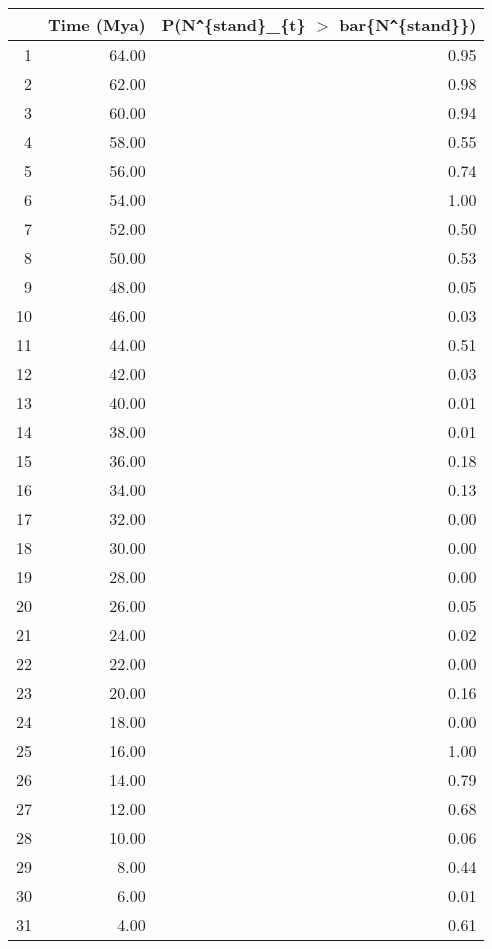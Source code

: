 \begin{table}[ht]
\centering
\begin{tabular}{rrr}
  \hline
 & Time (Mya) & P(N\verb|^|\{stand\}\_\{t\} $>$ bar\{N\verb|^|\{stand\}\}) \\ 
  \hline
1 & 64.00 & 0.95 \\ 
  2 & 62.00 & 0.98 \\ 
  3 & 60.00 & 0.94 \\ 
  4 & 58.00 & 0.55 \\ 
  5 & 56.00 & 0.74 \\ 
  6 & 54.00 & 1.00 \\ 
  7 & 52.00 & 0.50 \\ 
  8 & 50.00 & 0.53 \\ 
  9 & 48.00 & 0.05 \\ 
  10 & 46.00 & 0.03 \\ 
  11 & 44.00 & 0.51 \\ 
  12 & 42.00 & 0.03 \\ 
  13 & 40.00 & 0.01 \\ 
  14 & 38.00 & 0.01 \\ 
  15 & 36.00 & 0.18 \\ 
  16 & 34.00 & 0.13 \\ 
  17 & 32.00 & 0.00 \\ 
  18 & 30.00 & 0.00 \\ 
  19 & 28.00 & 0.00 \\ 
  20 & 26.00 & 0.05 \\ 
  21 & 24.00 & 0.02 \\ 
  22 & 22.00 & 0.00 \\ 
  23 & 20.00 & 0.16 \\ 
  24 & 18.00 & 0.00 \\ 
  25 & 16.00 & 1.00 \\ 
  26 & 14.00 & 0.79 \\ 
  27 & 12.00 & 0.68 \\ 
  28 & 10.00 & 0.06 \\ 
  29 & 8.00 & 0.44 \\ 
  30 & 6.00 & 0.01 \\ 
  31 & 4.00 & 0.61 \\ 
   \hline
\end{tabular}
\label{tab:div_peak}
\end{table}
